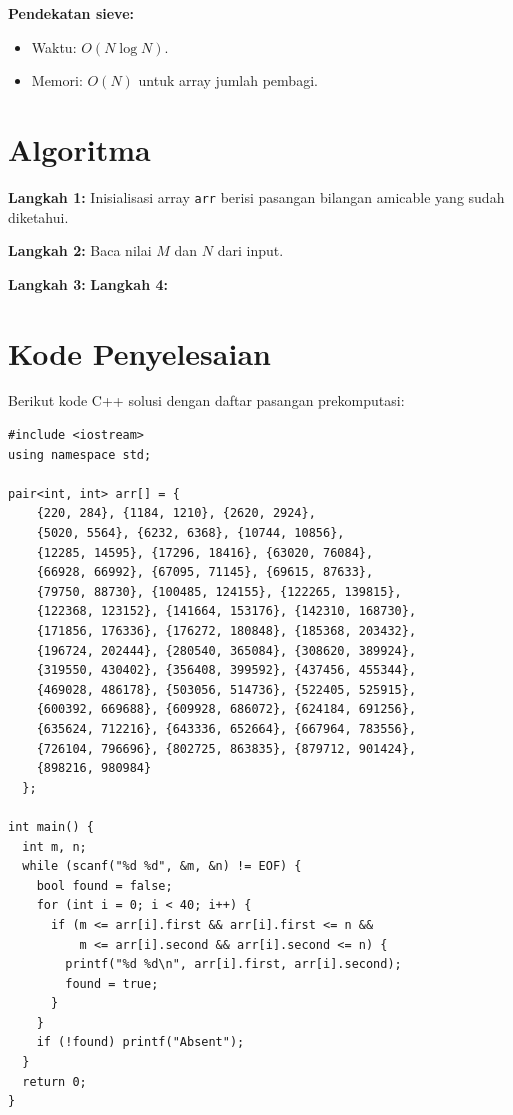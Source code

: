 \documentclass[12pt,a4paper]{article}
\begin{document}
\textbf{Pendekatan sieve:}
\begin{itemize}
  \item Waktu: \(O(N \log N)\).
  \item Memori: \(O(N)\) untuk array jumlah pembagi.
\end{itemize}

\section{Algoritma}

\begin{algorithm}[H]
\caption{Menemukan Pasangan Friendly Numbers dalam Interval [M, N]}
\SetAlgoLined
{}
\BlankLine
\textbf{Langkah 1:} Inisialisasi array \texttt{arr} berisi pasangan bilangan amicable yang sudah diketahui.

\textbf{Langkah 2:} Baca nilai $M$ dan $N$ dari input.

\textbf{Langkah 3:} 
\textbf{Langkah 4:} 
\end{algorithm}

\section{Kode Penyelesaian}
Berikut kode C++ solusi dengan daftar pasangan prekomputasi:
\begin{lstlisting}
#include <iostream>
using namespace std;

pair<int, int> arr[] = {
    {220, 284}, {1184, 1210}, {2620, 2924},
    {5020, 5564}, {6232, 6368}, {10744, 10856},
    {12285, 14595}, {17296, 18416}, {63020, 76084}, 
    {66928, 66992}, {67095, 71145}, {69615, 87633},
    {79750, 88730}, {100485, 124155}, {122265, 139815}, 
    {122368, 123152}, {141664, 153176}, {142310, 168730},
    {171856, 176336}, {176272, 180848}, {185368, 203432}, 
    {196724, 202444}, {280540, 365084}, {308620, 389924}, 
    {319550, 430402}, {356408, 399592}, {437456, 455344}, 
    {469028, 486178}, {503056, 514736}, {522405, 525915}, 
    {600392, 669688}, {609928, 686072}, {624184, 691256}, 
    {635624, 712216}, {643336, 652664}, {667964, 783556}, 
    {726104, 796696}, {802725, 863835}, {879712, 901424}, 
    {898216, 980984}
  };

int main() {
  int m, n;
  while (scanf("%d %d", &m, &n) != EOF) {
    bool found = false;
    for (int i = 0; i < 40; i++) {
      if (m <= arr[i].first && arr[i].first <= n &&
          m <= arr[i].second && arr[i].second <= n) {
        printf("%d %d\n", arr[i].first, arr[i].second);
        found = true;
      }
    }
    if (!found) printf("Absent");
  }
  return 0;
}
\end{lstlisting}
\end{document}

